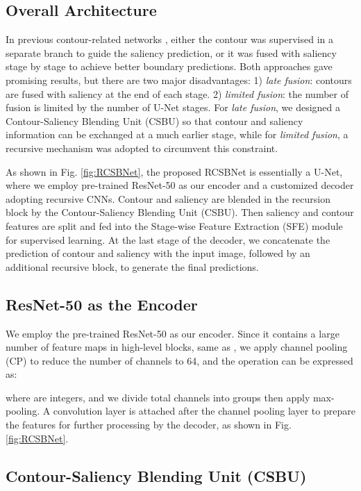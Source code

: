 \documentclass[10pt,twocolumn,letterpaper]{article}
\begin{document}
\subsection{Overall Architecture}
In previous contour-related networks \cite{POOLNET}\cite{EGNET}\cite{ITSD}, either the contour was supervised in a separate branch to guide the saliency prediction, or it was fused with saliency stage by stage to achieve better boundary predictions. Both approaches gave promising results, but there are two major disadvantages: 1) \textit{late fusion}: contours are fused with saliency at the end of each stage. 2) \textit{limited fusion}: the number of fusion is limited by the number of U-Net stages. For \textit{late fusion}, we designed a Contour-Saliency Blending Unit (CSBU) so that contour and saliency information can be exchanged at a much earlier stage,  while for \textit{limited fusion}, a recursive mechanism was adopted to circumvent this constraint.

As shown in Fig. \ref{fig:RCSBNet}, the proposed RCSBNet is essentially a U-Net, where we employ pre-trained ResNet-50 as our encoder and a customized decoder adopting recursive CNNs. Contour and saliency are blended in the recursion block by the Contour-Saliency Blending Unit (CSBU).  Then saliency and contour features are split and fed into the Stage-wise Feature Extraction (SFE) module for supervised learning. At the last stage of the decoder, we concatenate the prediction of contour and saliency with the input image, followed by an additional recursive block, to generate the final predictions.

\subsection{ResNet-50 as the Encoder}
We employ the pre-trained ResNet-50 as our encoder. Since it contains a large number of feature maps in high-level blocks,  same as \cite{ITSD}, we apply channel pooling (CP) to reduce the number of channels to 64, and the operation can be expressed as:

where  are integers, and we divide total  channels into  groups then apply max-pooling. A convolution layer is attached after the channel pooling layer to prepare the features for further processing by the decoder, as shown in Fig. \ref{fig:RCSBNet}.

\subsection{Contour-Saliency Blending Unit (CSBU)}
\end{document}
